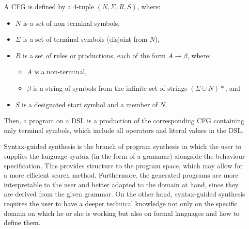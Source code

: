 \begin{definition}
A \ac{CFG} is defined by a 4-tuple \((N, \Sigma, R, S)\), where:
\begin{itemize}[itemsep=.3ex]
    \item \(N\) is a set of non-terminal symbols,
    
    \item \(\Sigma\) is a set of terminal symbols (disjoint from \(N\)),
    
    \item \(R\) is a set of rules or productions, each of the form \(A \to \beta\), where:
    \begin{itemize}
        \item \(A\) is a non-terminal,
        \item \(\beta\) is a string of symbols from the infinite set of strings \((\Sigma \cup N)*\), and
    \end{itemize}
    
    \item \(S\) is a designated start symbol and a member of \(N\).

\end{itemize}
\end{definition}

\noindent
Then, a program on a \ac{DSL} is a production of the corresponding \ac{CFG} containing only terminal symbols, which include all operators and literal values in the \ac{DSL}.

Syntax-guided synthesis \cite{DBLP:conf/fmcad/AlurBJMRSSSTU13,DBLP:conf/aaai/MortonHSPS20} is the branch of program synthesis in which the user to supplies the language syntax (in the form of a grammar) alongside the behaviour specification. This provides structure to the program space, which may allow for a more efficient search method. Furthermore, the generated programs are more interpretable to the user and better adapted to the domain at hand, since they are derived from the given grammar. On the other hand, syntax-guided synthesis requires the user to have a deeper technical knowledge not only on the specific domain on which he or she is working but also on formal languages and how to define them.


